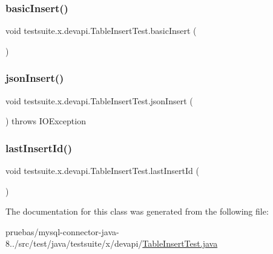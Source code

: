 \subsubsection{\texorpdfstring{basic\+Insert()}{basicInsert()}}
{\footnotesize\ttfamily void testsuite.\+x.\+devapi.\+Table\+Insert\+Test.\+basic\+Insert (\begin{DoxyParamCaption}{ }\end{DoxyParamCaption})}

\mbox{\label{classtestsuite_1_1x_1_1devapi_1_1_table_insert_test_ae19a2dfa061c082bbd792e5ddffaf3fc}} 
\subsubsection{\texorpdfstring{json\+Insert()}{jsonInsert()}}
{\footnotesize\ttfamily void testsuite.\+x.\+devapi.\+Table\+Insert\+Test.\+json\+Insert (\begin{DoxyParamCaption}{ }\end{DoxyParamCaption}) throws I\+O\+Exception}

\mbox{\label{classtestsuite_1_1x_1_1devapi_1_1_table_insert_test_a2d64d9c5ab05ed9b0aee79822f4da8f1}} 
\subsubsection{\texorpdfstring{last\+Insert\+Id()}{lastInsertId()}}
{\footnotesize\ttfamily void testsuite.\+x.\+devapi.\+Table\+Insert\+Test.\+last\+Insert\+Id (\begin{DoxyParamCaption}{ }\end{DoxyParamCaption})}



The documentation for this class was generated from the following file\+:\begin{DoxyCompactItemize}
\item 
pruebas/mysql-\/connector-\/java-\/8../src/test/java/testsuite/x/devapi/\mbox{\hyperlink{_table_insert_test_8java}{Table\+Insert\+Test.\+java}}\end{DoxyCompactItemize}
